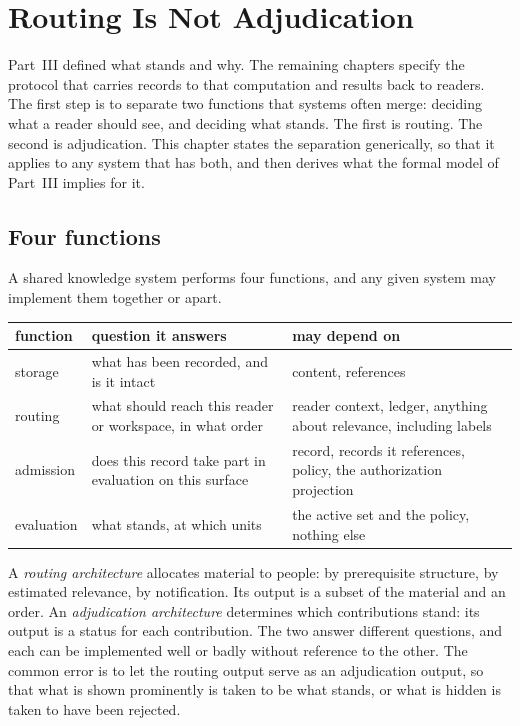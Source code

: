 \chapter{Routing Is Not Adjudication}\label{ch:routing}

Part~III defined what stands and why. The remaining chapters specify the protocol that carries records to that computation and results back to readers. The first step is to separate two functions that systems often merge: deciding what a reader should see, and deciding what stands. The first is routing. The second is adjudication. This chapter states the separation generically, so that it applies to any system that has both, and then derives what the formal model of Part~III implies for it.

\section{Four functions}\label{sec:fourfunctions}

A shared knowledge system performs four functions, and any given system may implement them together or apart.

\begin{center}
\small
\begin{tabularx}{\textwidth}{@{}l X X@{}}
\toprule
function & question it answers & may depend on\\
\midrule
storage & what has been recorded, and is it intact & content, references\\
routing & what should reach this reader or workspace, in what order & reader context, ledger, anything about relevance, including labels\\
admission & does this record take part in evaluation on this surface & record, records it references, policy, the authorization projection\\
evaluation & what stands, at which units & the active set and the policy, nothing else\\
\bottomrule
\end{tabularx}
\end{center}

A \emph{routing architecture} allocates material to people: by prerequisite structure, by estimated relevance, by notification. Its output is a subset of the material and an order. An \emph{adjudication architecture} determines which contributions stand: its output is a status for each contribution. The two answer different questions, and each can be implemented well or badly without reference to the other. The common error is to let the routing output serve as an adjudication output, so that what is shown prominently is taken to be what stands, or what is hidden is taken to have been rejected.


